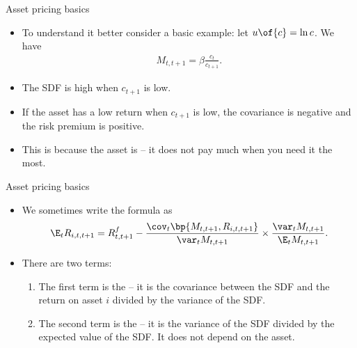 \documentclass[11pt,xcolor={dvipsnames},aspectratio=159,hyperref={pdftex,pdfpagemode=UseNone,hidelinks,pdfdisplaydoctitle=true},usepdftitle=false]{beamer}
\begin{document}
\begin{frame}{Asset pricing basics}  
    \begin{itemize}
        \item To understand it better consider a basic example: let $u\of{c} = \ln c$. We have \begin{align*}
            M_{t,t+1} = \beta \frac{c_{t}}{c_{t+1}}.
        \end{align*}
        \item The SDF is high when $c_{t+1}$ is low.
        \item If the asset has a low return when $c_{t+1}$ is low, the covariance is negative and the risk premium is positive.
        \item This is because the asset is  -- it does not pay much when you need it the most. 
\end{itemize}
\end{frame}

\begin{frame}{Asset pricing basics}  
    \begin{itemize}
        \item We sometimes write the formula as
            \begin{align*}
            \E_t R_{i,t,t+1} = R^f_{t,t+1} - \frac{\cov_t \bp{M_{t,t+1}, R_{i,t,t+1}}}{\var_t M_{t,t+1}} \times \frac{\var_t M_{t,t+1}}{\E_t M_{t,t+1}}.
        \end{align*}
        \item There are two terms: \begin{enumerate}
            \item The first term is the  -- it is the covariance between the SDF and the return on asset $i$ divided by the variance of the SDF.
            \item The second term is the  -- it is the variance of the SDF divided by the expected value of the SDF. It does not depend on the asset.
        \end{enumerate}
    \end{itemize}
\end{frame}
\end{document}
